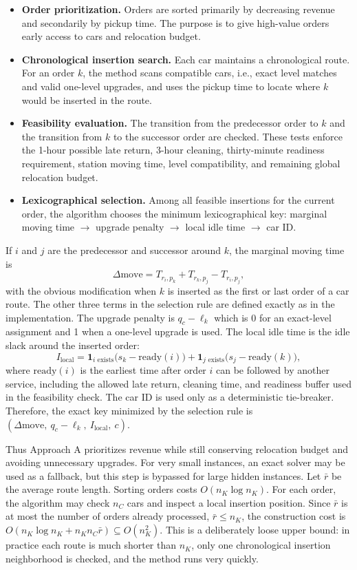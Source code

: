 \documentclass[10pt,a4paper]{article}
\begin{document}
\begin{itemize}[itemsep=2pt, parsep=0pt, topsep=4pt]
    \item \textbf{Order prioritization.} Orders are sorted primarily by
    decreasing revenue and secondarily by pickup time.  The purpose is to give
    high-value orders early access to cars and relocation budget.
    \item \textbf{Chronological insertion search.} Each car maintains a
    chronological route.  For an order $k$, the method scans compatible cars,
    i.e., exact level matches and valid one-level upgrades, and uses the pickup
    time to locate where $k$ would be inserted in the route.
    \item \textbf{Feasibility evaluation.} The transition from the predecessor
    order to $k$ and the transition from $k$ to the successor order are checked.
    These tests enforce the 1-hour possible late return, 3-hour cleaning,
    thirty-minute readiness requirement, station moving time, level
    compatibility, and remaining global relocation budget.
    \item \textbf{Lexicographical selection.} Among all feasible insertions for
    the current order, the algorithm chooses the minimum lexicographical key:
    marginal moving time $\rightarrow$ upgrade penalty $\rightarrow$  local idle time $\rightarrow$ car ID.
\end{itemize}

If $i$ and $j$ are the predecessor and successor around $k$, the marginal moving
time is
\[
\Delta\text{move}=T_{r_i,p_k}+T_{r_k,p_j}-T_{r_i,p_j},
\]
with the obvious modification when $k$ is inserted as the first or last order of
a car route. The other three terms in the selection rule are defined exactly as in the implementation. The upgrade penalty is $q_c-\ell_k$
which is 0 for an exact-level assignment and 1 when a one-level upgrade is used. The local idle time is the idle slack around the inserted order:
\[
I_{\text{local}}
=\mathbf{1}_{i\text{ exists}}\big(s_k-\mathrm{ready}(i)\big)
+\mathbf{1}_{j\text{ exists}}\big(s_j-\mathrm{ready}(k)\big),
\]
where $\mathrm{ready}(i)$ is the earliest time after order $i$ can be followed
by another service, including the allowed late return, cleaning time, and
readiness buffer used in the feasibility check.  The car ID is used only as a
deterministic tie-breaker.  Therefore, the exact key minimized by the selection
rule is $(\Delta\text{move},\ q_c-\ell_k,\ I_{\text{local}},\ c)$.

Thus Approach A prioritizes revenue while still conserving relocation budget and
avoiding unnecessary upgrades.  For very small instances, an exact solver may be
used as a fallback, but this step is bypassed for large hidden instances.  Let
$\bar r$ be the average route length.  Sorting orders costs $O(n_K\log n_K)$.
For each order, the algorithm may check $n_C$ cars and inspect a local insertion
position.  Since $\bar r$ is at most the number of orders already processed,
$\bar r\le n_K$, the construction cost is
$O(n_K\log n_K+n_Kn_C\bar r)\subseteq O(n_K^2)$.
This is a deliberately loose upper bound: in practice each route is much shorter
than $n_K$, only one chronological insertion neighborhood is checked, and the
method runs very quickly.
\end{document}
